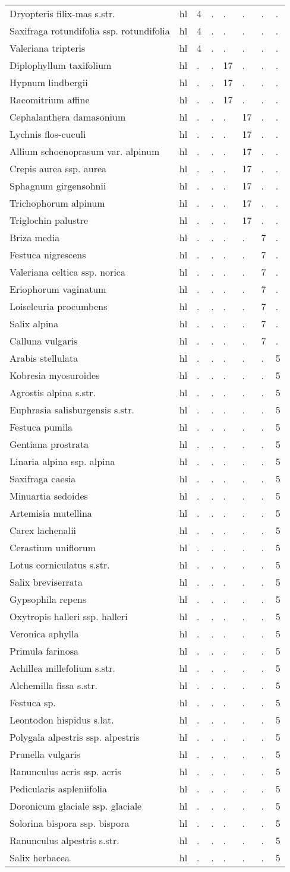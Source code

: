 \begin{longtable}{p{60mm}p{10mm}p{5mm}p{5mm}p{5mm}p{5mm}p{5mm}p{5mm}}
Dryopteris filix-mas s.str.&hl&4&.&.&.&.&.\tabularnewline
Saxifraga rotundifolia ssp. rotundifolia&hl&4&.&.&.&.&.\tabularnewline
Valeriana tripteris&hl&4&.&.&.&.&.\tabularnewline
Diplophyllum taxifolium&hl&.&.&17&.&.&.\tabularnewline
Hypnum lindbergii&hl&.&.&17&.&.&.\tabularnewline
Racomitrium affine&hl&.&.&17&.&.&.\tabularnewline
Cephalanthera damasonium&hl&.&.&.&17&.&.\tabularnewline
Lychnis flos-cuculi&hl&.&.&.&17&.&.\tabularnewline
Allium schoenoprasum var. alpinum&hl&.&.&.&17&.&.\tabularnewline
Crepis aurea ssp. aurea&hl&.&.&.&17&.&.\tabularnewline
Sphagnum girgensohnii&hl&.&.&.&17&.&.\tabularnewline
Trichophorum alpinum&hl&.&.&.&17&.&.\tabularnewline
Triglochin palustre&hl&.&.&.&17&.&.\tabularnewline
Briza media&hl&.&.&.&.&7&.\tabularnewline
Festuca nigrescens&hl&.&.&.&.&7&.\tabularnewline
Valeriana celtica ssp. norica&hl&.&.&.&.&7&.\tabularnewline
Eriophorum vaginatum&hl&.&.&.&.&7&.\tabularnewline
Loiseleuria procumbens&hl&.&.&.&.&7&.\tabularnewline
Salix alpina&hl&.&.&.&.&7&.\tabularnewline
Calluna vulgaris&hl&.&.&.&.&7&.\tabularnewline
Arabis stellulata&hl&.&.&.&.&.&5\tabularnewline
Kobresia myosuroides&hl&.&.&.&.&.&5\tabularnewline
Agrostis alpina s.str.&hl&.&.&.&.&.&5\tabularnewline
Euphrasia salisburgensis s.str.&hl&.&.&.&.&.&5\tabularnewline
Festuca pumila&hl&.&.&.&.&.&5\tabularnewline
Gentiana prostrata&hl&.&.&.&.&.&5\tabularnewline
Linaria alpina ssp. alpina&hl&.&.&.&.&.&5\tabularnewline
Saxifraga caesia&hl&.&.&.&.&.&5\tabularnewline
Minuartia sedoides&hl&.&.&.&.&.&5\tabularnewline
Artemisia mutellina&hl&.&.&.&.&.&5\tabularnewline
Carex lachenalii&hl&.&.&.&.&.&5\tabularnewline
Cerastium uniflorum&hl&.&.&.&.&.&5\tabularnewline
Lotus corniculatus s.str.&hl&.&.&.&.&.&5\tabularnewline
Salix breviserrata&hl&.&.&.&.&.&5\tabularnewline
Gypsophila repens&hl&.&.&.&.&.&5\tabularnewline
Oxytropis halleri ssp. halleri&hl&.&.&.&.&.&5\tabularnewline
Veronica aphylla&hl&.&.&.&.&.&5\tabularnewline
Primula farinosa&hl&.&.&.&.&.&5\tabularnewline
Achillea millefolium s.str.&hl&.&.&.&.&.&5\tabularnewline
Alchemilla fissa s.str.&hl&.&.&.&.&.&5\tabularnewline
Festuca sp.&hl&.&.&.&.&.&5\tabularnewline
Leontodon hispidus s.lat.&hl&.&.&.&.&.&5\tabularnewline
Polygala alpestris ssp. alpestris&hl&.&.&.&.&.&5\tabularnewline
Prunella vulgaris&hl&.&.&.&.&.&5\tabularnewline
Ranunculus acris ssp. acris&hl&.&.&.&.&.&5\tabularnewline
Pedicularis aspleniifolia&hl&.&.&.&.&.&5\tabularnewline
Doronicum glaciale ssp. glaciale&hl&.&.&.&.&.&5\tabularnewline
Solorina bispora ssp. bispora&hl&.&.&.&.&.&5\tabularnewline
Ranunculus alpestris s.str.&hl&.&.&.&.&.&5\tabularnewline
Salix herbacea&hl&.&.&.&.&.&5\tabularnewline

\end{longtable}
